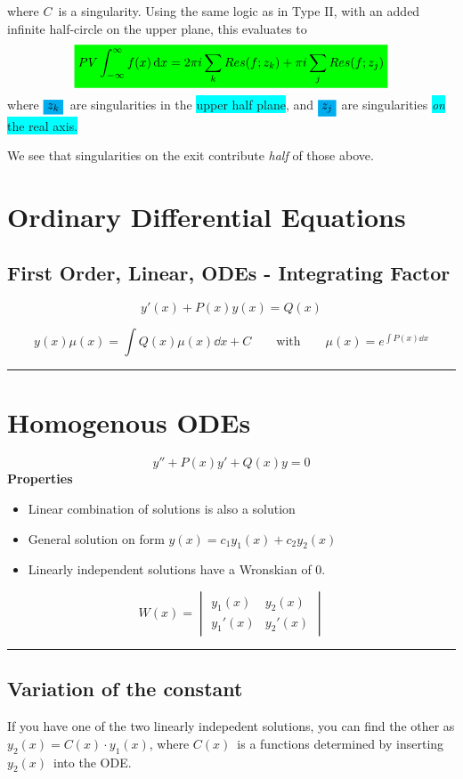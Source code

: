 \documentclass[10pt,a4paper]{article}
\renewcommand{\exp}{e^}
\newcommand{\infint}{\int_{-\infty}^{\infty}}
\newcommand{\holine}{\rule{286pt}{1pt}}
\newcommand{\Holine}{\rule{286pt}{3pt}}
\newcommand{\gr}[1]{\colorbox{green}{$\displaystyle #1$}}
\newcommand{\bl}[1]{\colorbox{cyan}{$\displaystyle #1$}}
\newcommand{\bll}{\colorbox{cyan}}
\begin{document}
\begin{multicols}{2}
where $C$ is a singularity. Using the same logic as in Type II, with an added infinite half-circle on the upper plane, this evaluates to
\[
\gr{
    PV\infint f(x) \dd{x} = 2\pi i \sum_k Res(f; z_k) + \pi i \sum_j Res(f;z_j)
}
\]
where $\bl{z_k}$ are singularities in the \bll{upper half plane}, and $\bl{z_j}$ are singularities \bll{\textit{on} the real axis.}

We see that singularities on the exit contribute \textit{half} of those above.




\newpage
\section*{Ordinary Differential Equations}

\subsection*{First Order, Linear, ODEs - Integrating Factor}
\[
    y'(x) + P(x) y(x) = Q(x)
\]

\[
    y(x)\mu(x) = \int Q(x)\mu(x) \dd{x} + C \quad\quad\text{with}\quad\quad \mu(x) = \exp{\int P(x)\dd{x}}
\]




\Holine
\section*{Homogenous ODEs}
\[
    y'' + P(x)y' + Q(x)y = 0
\]
\textbf{Properties}
\begin{itemize}
    \item Linear combination of solutions is also a solution
    \item General solution on form $y(x) = c_1 y_1(x) + c_2 y_2(x)$
    \item Linearly independent solutions have a Wronskian of 0.
\end{itemize}
\[
    W(x) = 
    \begin{vmatrix} y_1(x) & y_2(x) \\ y_1'(x) & y_2'(x) \end{vmatrix}
\]


\holine
\subsection*{Variation of the constant}
If you have one of the two linearly indepedent solutions, you can find the other as $y_2(x) = C(x)\cdot y_1(x)$, where $C(x)$ is a functions determined by inserting $y_2(x)$ into the ODE.


\end{multicols}
\end{document}
